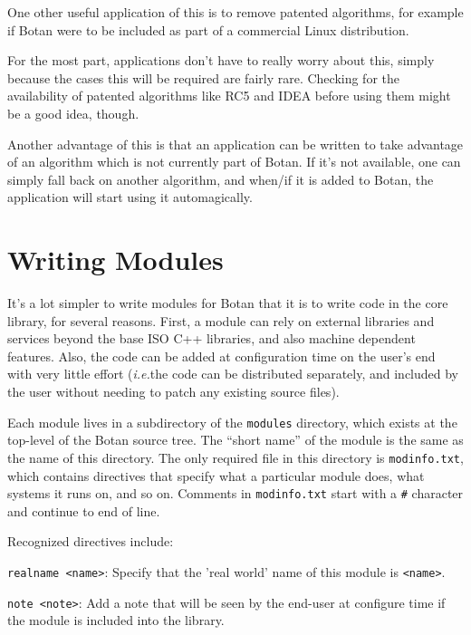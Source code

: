 \documentclass{article}
\newcommand{\filename}[1]{\texttt{#1}}
\newcommand{\ie}[0]{\emph{i.e.}}
\begin{document}
One other useful application of this is to remove patented algorithms, for
example if Botan were to be included as part of a commercial Linux
distribution.

For the most part, applications don't have to really worry about this, simply
because the cases this will be required are fairly rare. Checking for the
availability of patented algorithms like RC5 and IDEA before using them might
be a good idea, though.

Another advantage of this is that an application can be written to take
advantage of an algorithm which is not currently part of Botan. If it's not
available, one can simply fall back on another algorithm, and when/if it is
added to Botan, the application will start using it automagically.

\pagebreak

\section{Writing Modules}

It's a lot simpler to write modules for Botan that it is to write code
in the core library, for several reasons. First, a module can rely on
external libraries and services beyond the base ISO C++ libraries, and
also machine dependent features. Also, the code can be added at
configuration time on the user's end with very little effort (\ie the
code can be distributed separately, and included by the user without
needing to patch any existing source files).

Each module lives in a subdirectory of the \filename{modules}
directory, which exists at the top-level of the Botan source tree. The
``short name'' of the module is the same as the name of this
directory. The only required file in this directory is
\filename{modinfo.txt}, which contains directives that specify what a
particular module does, what systems it runs on, and so on. Comments
in \filename{modinfo.txt} start with a \verb|#| character and continue
to end of line.

Recognized directives include:

\newcommand{\directive}[2]{
   \vskip 4pt
   \noindent
   \texttt{#1}: #2
}

\directive{realname <name>}{Specify that the 'real world' name of this module
   is \texttt{<name>}.}

\directive{note <note>}{Add a note that will be seen by the end-user at
configure time if the module is included into the library.}
\end{document}
